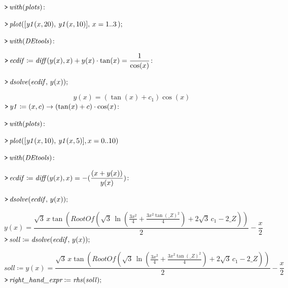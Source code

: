 \documentclass{article}
\begin{document}
\mapleinput
{$ \displaystyle \texttt{>\,} \mathit{with} (\mathit{plots})\colon  $}

\mapleinput
{$ \displaystyle \texttt{>\,} \mathit{plot} ([\mathit{y1} (x ,20),\,\mathit{y1} (x ,10)],\,x =1..3\,); $}

{}
\mapleinput
{$ \displaystyle \texttt{>\,} \mathit{with} (\mathit{DEtools})\colon  $}

\mapleinput
{$ \displaystyle \texttt{>\,} \mathit{ecdif} \coloneqq \mathit{diff} (y (x),x)+y (x)\cdot \tan (x)=\frac{1}{\cos (x)}\colon  $}

\mapleinput
{$ \displaystyle \texttt{>\,} \mathit{dsolve} (\mathit{ecdif} ,\,y (x)); $}

\begin{dmath}\label{(6)}
y \! \left(x \right)=\left(\tan \! \left(x \right)+c_{1}\right) \cos \! \left(x \right)
\end{dmath}
\mapleinput
{$ \displaystyle \texttt{>\,} \mathit{y1} \coloneqq (x ,c)\rightarrow (\tan (x)+c)\cdot \cos (x)\colon  $}

\mapleinput
{$ \displaystyle \texttt{>\,} \mathit{with} (\mathit{plots})\colon  $}

\mapleinput
{$ \displaystyle \texttt{>\,} \mathit{plot} ([\mathit{y1} (x ,10),\,\mathit{y1} (x ,5)],x =0..10) $}

{}
\mapleinput
{$ \displaystyle \texttt{>\,} \mathit{with} (\mathit{DEtools})\colon  $}

\mapleinput
{$ \displaystyle \texttt{>\,} \mathit{ecdif} \coloneqq \mathit{diff} (y (x),x)=-(\frac{(x +y (x))}{y (x)})\colon  $}

\mapleinput
{$ \displaystyle \texttt{>\,} \mathit{dsolve} (\mathit{ecdif} ,\,y (x)); $}

\begin{dmath}\label{(7)}
y \! \left(x \right)=\frac{\sqrt{3}\, x \tan \! \left(\mathit{RootOf} \! \left(\sqrt{3}\, \ln \! \left(\frac{3 x^{2}}{4}+\frac{3 x^{2} \tan \left(\textit{\_Z} \right)^{2}}{4}\right)+2 \sqrt{3}\, c_{1}-2 \textit{\_Z} \right)\right)}{2}-\frac{x}{2}
\end{dmath}
\mapleinput
{$ \displaystyle \texttt{>\,} \mathit{soll} \coloneqq \mathit{dsolve} (\mathit{ecdif} ,\,y (x)); $}

\begin{dmath}\label{(8)}
\mathit{soll} \coloneqq y \! \left(x \right)=\frac{\sqrt{3}\, x \tan \! \left(\mathit{RootOf} \! \left(\sqrt{3}\, \ln \! \left(\frac{3 x^{2}}{4}+\frac{3 x^{2} \tan \left(\textit{\_Z} \right)^{2}}{4}\right)+2 \sqrt{3}\, c_{1}-2 \textit{\_Z} \right)\right)}{2}-\frac{x}{2}
\end{dmath}
\mapleinput
{$ \displaystyle \texttt{>\,} \textit{right\_hand\_expr} \coloneqq \mathit{rhs} (\mathit{soll}); $}
\end{document}
